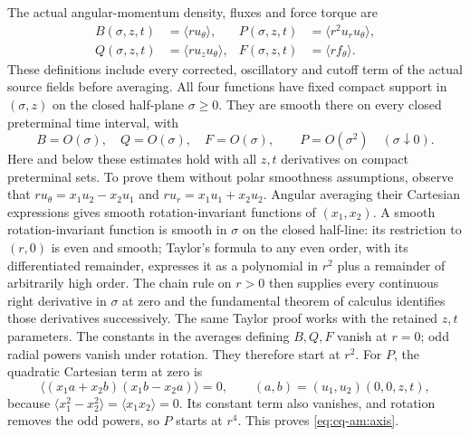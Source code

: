 The actual angular-momentum density, fluxes and force torque are
\begin{align*}
 B(\sigma,z,t)&=\langle r u_\theta\rangle,
 &P(\sigma,z,t)&=\langle r^2u_ru_\theta\rangle,\\
 Q(\sigma,z,t)&=\langle r u_zu_\theta\rangle,
 &F(\sigma,z,t)&=\langle r f_\theta\rangle.
\end{align*}
These definitions include every corrected, oscillatory and cutoff term
of the actual source fields before averaging. All four functions have
fixed compact support in $(\sigma,z)$ on the closed half-plane
$\sigma\geq0$. They are smooth there on every closed preterminal
time interval, with
\begin{equation}
 B=O(\sigma),\quad Q=O(\sigma),\quad F=O(\sigma),
 \qquad P=O(\sigma^2)\quad(\sigma\downarrow0).
 \label{eq:cq-am:axis}
\end{equation}
Here and below these estimates hold with all $z,t$ derivatives on
compact preterminal sets. To prove them without polar smoothness
assumptions, observe that $r u_\theta=x_1u_2-x_2u_1$ and
$r u_r=x_1u_1+x_2u_2$. Angular averaging their Cartesian expressions
gives smooth rotation-invariant functions of $(x_1,x_2)$.
A smooth rotation-invariant function is smooth in $\sigma$ on the
closed half-line: its restriction to $(r,0)$ is even and smooth;
Taylor's formula to any even order, with its differentiated remainder,
expresses it as a polynomial in $r^2$ plus a remainder of arbitrarily
high order. The chain rule on $r>0$ then supplies every continuous
right derivative in $\sigma$ at zero and the fundamental theorem of
calculus identifies those derivatives successively. The same Taylor
proof works with the retained $z,t$ parameters.
The constants in the averages defining $B,Q,F$ vanish at $r=0$;
odd radial powers vanish under rotation. They therefore start at
$r^2$. For $P$, the quadratic Cartesian term at zero is
\[
 \big\langle(x_1a+x_2b)(x_1b-x_2a)\big\rangle=0,
 \qquad (a,b)=(u_1,u_2)(0,0,z,t),
\]
because $\langle x_1^2-x_2^2\rangle=
\langle x_1x_2\rangle=0$. Its constant term also vanishes, and
rotation removes the odd powers, so $P$ starts at $r^4$.
This proves \eqref{eq:cq-am:axis}.

